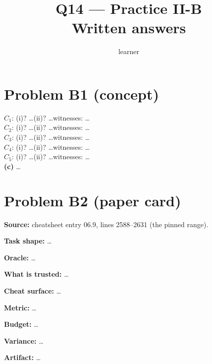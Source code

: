 \documentclass[11pt]{article}
\title{Q14 --- Practice II-B \\ \large Written answers}
\author{learner}
\date{}
\begin{document}
\maketitle

\section*{Problem B1 (concept)}\label{ans:B1}
\begin{answer}
$C_1$: (i)? \dots \quad (ii)? \dots \quad witnesses: \dots \\
$C_2$: (i)? \dots \quad (ii)? \dots \quad witnesses: \dots \\
$C_3$: (i)? \dots \quad (ii)? \dots \quad witnesses: \dots \\
$C_4$: (i)? \dots \quad (ii)? \dots \quad witnesses: \dots \\
$C_5$: (i)? \dots \quad (ii)? \dots \quad witnesses: \dots \\
\textbf{(c)} \dots
\end{answer}

\section*{Problem B2 (paper card)}\label{ans:B2}
\begin{answer}
\textbf{Source:} cheatsheet entry 06.9, lines 2588--2631 (the pinned range).

\textbf{Task shape:} \dots

\textbf{Oracle:} \dots

\textbf{What is trusted:} \dots

\textbf{Cheat surface:} \dots

\textbf{Metric:} \dots

\textbf{Budget:} \dots

\textbf{Variance:} \dots

\textbf{Artifact:} \dots
\end{answer}
\end{document}
